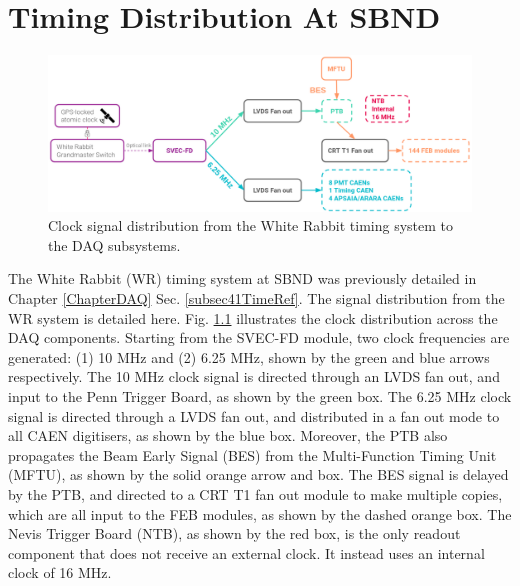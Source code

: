 
\chapter{Timing Distribution At SBND} 
\label{appendix_timing_dist}
\ifpdf
    \graphicspath{{Appendix3/Figs/Raster/}{Appendix3/Figs/PDF/}{Appendix3/Figs/}}
\else
    \graphicspath{{Appendix3/Figs/Vector/}{Appendix3/Figs/}}
\fi


\begin{figure}[b!] 
\centering    
\includegraphics[width=1.0\textwidth]{clock_dist}
\caption[Clock Signal Distribution]{
Clock signal distribution from the White Rabbit timing system to the DAQ subsystems. 
}
\label{fig:clock_dist}
\end{figure}

The White Rabbit (WR) timing system at SBND was previously detailed in Chapter \ref{ChapterDAQ} Sec. \ref{subsec41TimeRef}.                                            
The signal distribution from the WR system is detailed here.                                                                                                           
Fig. \ref{fig:clock_dist} illustrates the clock distribution across the DAQ components.                                                                                
Starting from the SVEC-FD module, two clock frequencies are generated: (1) 10 MHz and (2) 6.25 MHz, shown by the green and blue arrows respectively.
The 10 MHz clock signal is directed through an LVDS fan out, and input to the Penn Trigger Board, as shown by the green box.
The 6.25 MHz clock signal is directed through a LVDS fan out, and distributed in a fan out mode to all CAEN digitisers, as shown by the blue box.                      
Moreover, the PTB also propagates the Beam Early Signal (BES) from the Multi-Function Timing Unit (MFTU), as shown by the solid orange arrow and box.                  
The BES signal is delayed by the PTB, and directed to a CRT T1 fan out module to make multiple copies, which are all input to the FEB modules, as shown by the dashed orange box.                                                                                                                                                             
The Nevis Trigger Board (NTB), as shown by the red box, is the only readout component that does not receive an external clock.                                         
It instead uses an internal clock of 16 MHz.                                                                                                                           

